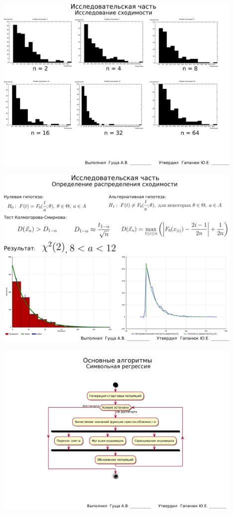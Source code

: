 \documentclass[russian,utf8, a1paper, emptystyle]{eskdgraph}
\begin{document}
\begin{ESKDdrawing}
\includegraphics[width=0.90\textwidth]{lists/list10_2}
\end{ESKDdrawing}

\begin{ESKDdrawing}
\includegraphics[width=0.90\textwidth]{lists/list10_3}
\end{ESKDdrawing}

\begin{ESKDdrawing}
\includegraphics[width=0.90\textwidth]{lists/list11_1}
\end{ESKDdrawing}
\end{document}
